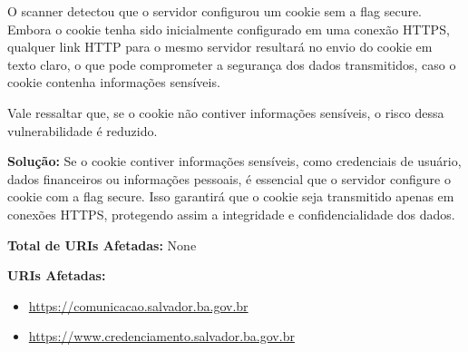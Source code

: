 \documentclass[a4paper,12pt]{article}
\begin{document}
\begin{enumerate}
O scanner detectou que o servidor configurou um cookie sem a flag secure. Embora o cookie tenha sido inicialmente configurado em uma conexão HTTPS, qualquer link HTTP para o mesmo servidor resultará no envio do cookie em texto claro, o que pode comprometer a segurança dos dados transmitidos, caso o cookie contenha informações sensíveis.

Vale ressaltar que, se o cookie não contiver informações sensíveis, o risco dessa vulnerabilidade é reduzido.

\textbf{Solução:} Se o cookie contiver informações sensíveis, como credenciais de usuário, dados financeiros ou informações pessoais, é essencial que o servidor configure o cookie com a flag secure. Isso garantirá que o cookie seja transmitido apenas em conexões HTTPS, protegendo assim a integridade e confidencialidade dos dados.

\textbf{Total de URIs Afetadas:} None

\textbf{URIs Afetadas:}
\begin{itemize}
    \item \url{https://comunicacao.salvador.ba.gov.br}
    \item \url{https://www.credenciamento.salvador.ba.gov.br}
\end{itemize}

\end{enumerate}
\end{document}

